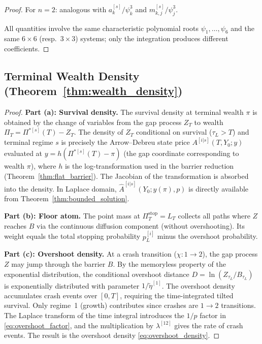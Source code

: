 \documentclass[11pt,a4paper]{article}
\numberwithin{equation}{section}
\begin{document}
\begin{appendices}
\begin{proof}
For $n = 2$: analogous with $a^{[s]}_k/\psi_k^3$ and $m^{[s]}_{k,j}/\psi_j^3$.

All quantities involve the same characteristic polynomial roots $\psi_1, \ldots, \psi_6$ and the same $6 \times 6$ (resp.\ $3 \times 3$) systems; only the integration produces different coefficients.
\end{proof}


\subsection{Terminal Wealth Density (Theorem~\ref{thm:wealth_density})}\label{app:wealth_density}

\begin{proof}
\textbf{Part (a): Survival density.} The survival density at terminal wealth $\pi$ is obtained by the change of variables from the gap process $Z_T$ to wealth $\Pi_T = \Pi^{*[s]}(T) - Z_T$. The density of $Z_T$ conditional on survival ($\tau_L > T$) and terminal regime $s$ is precisely the Arrow--Debreu state price $A^{[i|s]}(T, Y_0; y)$ evaluated at $y = h(\Pi^{*[s]}(T) - \pi)$ (the gap coordinate corresponding to wealth $\pi$), where $h$ is the log-transformation used in the barrier reduction (Theorem~\ref{thm:flat_barrier}). The Jacobian of the transformation is absorbed into the density. In Laplace domain, $\hat{A}^{[i|s]}(Y_0; y(\pi), p)$ is directly available from Theorem~\ref{thm:bounded_solution}.

\textbf{Part (b): Floor atom.} The point mass at $\Pi^{\mathrm{stop}}_T = L_T$ collects all paths where $Z$ reaches $B$ via the continuous diffusion component (without overshooting). Its weight equals the total stopping probability $p^{[i]}_L$ minus the overshoot probability.

\textbf{Part (c): Overshoot density.} At a crash transition ($\chi: 1 \to 2$), the gap process $Z$ may jump through the barrier $B$. By the memoryless property of the exponential distribution, the conditional overshoot distance $D = \ln(Z_{\tau_L}/B_{\tau_L})$ is exponentially distributed with parameter $1/\tilde\eta^{[1]}$.  The overshoot density accumulates crash events over $[0,T]$, requiring the time-integrated tilted survival.  Only regime~1 (growth) contributes since crashes are $1 \to 2$ transitions.  The Laplace transform of the time integral introduces the $1/p$ factor in \eqref{eq:overshoot_factor}, and the multiplication by $\lambda^{[12]}$ gives the rate of crash events. The result is the overshoot density \eqref{eq:overshoot_density}.
\end{proof}




\end{appendices}
\end{document}
